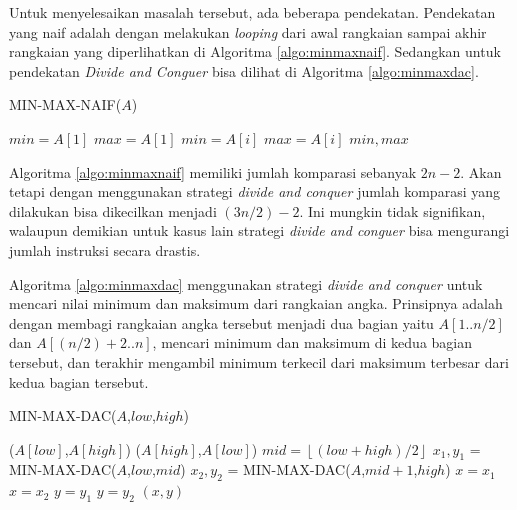 Untuk menyelesaikan masalah tersebut, ada beberapa pendekatan. Pendekatan yang naif adalah dengan melakukan \textit{looping} dari awal rangkaian sampai akhir rangkaian yang diperlihatkan di Algoritma \ref{algo:minmaxnaif}. Sedangkan untuk pendekatan \textit{Divide and Conguer} bisa dilihat di Algoritma \ref{algo:minmaxdac}.

\begin{algorithm}[H]
	\caption{MIN-MAX-NAIF($A$)}
	\label{algo:minmaxnaif}
	\begin{algorithmic}[1]
		\STATE $min = A[1]$
		\STATE $max = A[1]$
				\STATE $min = A[i]$
			\ENDIF
				\STATE $max = A[i]$
			\ENDIF
		\ENDFOR
		\RETURN $min,max$
	\end{algorithmic}
\end{algorithm}

Algoritma \ref{algo:minmaxnaif} memiliki jumlah komparasi sebanyak $2n-2$. Akan tetapi dengan menggunakan strategi \textit{divide and conquer} jumlah komparasi yang dilakukan bisa dikecilkan menjadi $(3n/2)-2$. Ini mungkin tidak signifikan, walaupun demikian untuk kasus lain strategi \textit{divide and conguer} bisa mengurangi jumlah instruksi secara drastis. 

Algoritma \ref{algo:minmaxdac} menggunakan strategi \textit{divide and conquer} untuk mencari nilai minimum dan maksimum dari rangkaian angka. Prinsipnya adalah dengan membagi rangkaian angka tersebut menjadi dua bagian yaitu $A[1..n/2]$ dan $A[(n/2)+2..n]$, mencari minimum dan maksimum di kedua bagian tersebut, dan terakhir mengambil minimum terkecil dari maksimum terbesar dari kedua bagian tersebut.

\begin{algorithm}[H]
	\caption{MIN-MAX-DAC($A$,$low$,$high$)}
	\label{algo:minmaxdac}
	\begin{algorithmic}[1]
				\RETURN ($A[low]$,$A[high]$)
			\ELSE
				\RETURN ($A[high]$,$A[low]$)
			\ENDIF
		\ELSE
			\STATE $mid = \left\lfloor (low+high)/2\right\rfloor$
			\STATE $x_1,y_1$ = MIN-MAX-DAC($A$,$low$,$mid$)
			\STATE $x_2,y_2$ = MIN-MAX-DAC($A$,$mid+1$,$high$)
				\STATE $x = x_1$
			\ELSE
				\STATE $x = x_2$
			\ENDIF
				\STATE $y = y_1$
			\ELSE
				\STATE $y = y_2$
			\ENDIF  
			\RETURN $(x,y)$
		\ENDIF
	\end{algorithmic}
\end{algorithm}



